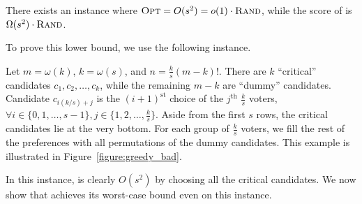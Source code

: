 \begin{theorem}
\label{thm:sbordalb}
There exists an instance where ${\normalfont\textsc{Opt}} = O(s^2) = o(1) \cdot {\normalfont\textsc{Rand}}$, while the score of \g{} is $\Omega(s^2)\cdot {\normalfont\textsc{Rand}}$.
\end{theorem}
To prove this lower bound, we use the following instance.
\begin{example}
Let $m = \omega(k)$, $k = \omega(s)$, and $n = \frac{k}{s}(m - k)!$. There are $k$ ``critical'' candidates $c_1, c_2, \ldots, c_k$, while the remaining $m - k$ are ``dummy'' candidates. Candidate $c_{i(k/s) + j}$ is the $(i + 1)^{\text{st}}$ choice of the $j^{\text{th}}$ $\frac{k}{s}$ voters, $\forall i \in \{0, 1, \ldots, s - 1\}, j \in \{1, 2, \ldots, \frac{k}{s}\}$. Aside from the first $s$ rows, the critical candidates lie at the very bottom. For each group of $\frac{k}{s}$ voters, we fill the rest of the preferences with all permutations of the dummy candidates. This example is illustrated in Figure~\ref{figure:greedy_bad}. %
\label{example:greedy_bad}
\end{example}



In this instance, \opt{} is clearly $O(s^2)$ by choosing all the critical candidates. We now show that \g{} achieves its worst-case bound even on this instance.

